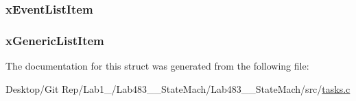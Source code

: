 \hypertarget{structtsk_task_control_block_a110903e360ab25721be3682104ded665}{
\subsubsection[{x\-Event\-List\-Item}]{ x\-Event\-List\-Item}}\label{structtsk_task_control_block_a110903e360ab25721be3682104ded665}
\hypertarget{structtsk_task_control_block_a39d74720fd46611d1223644cb9e539eb}{
\subsubsection[{x\-Generic\-List\-Item}]{ x\-Generic\-List\-Item}}\label{structtsk_task_control_block_a39d74720fd46611d1223644cb9e539eb}


The documentation for this struct was generated from the following file\-:\begin{DoxyCompactItemize}
\item 
Desktop/\-Git Rep/\-Lab1\-\_/\-Lab483\-\_\-\_\-\-State\-Mach/\-Lab483\-\_\-\_\-\-State\-Mach/src/\hyperlink{tasks_8c}{tasks.\-c}\end{DoxyCompactItemize}
